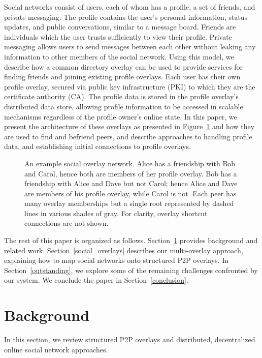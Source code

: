 \documentclass[letterpaper,twocolumn,10pt]{article}
\begin{document}
Social networks consist of users, each of whom has a profile, a set
of friends, and private messaging.  The profile contains the user's
personal information, status updates, and public conversations, similar to a
message board.  Friends are
individuals which the user trusts sufficiently to view their profile.  Private
messaging allows users to send messages between each other without leaking any
information to other members of the social network.  Using this model, we describe how a common
directory overlay can be used to provide services for finding friends and
joining existing profile overlays.  Each user has their own profile overlay,
secured via public key infrastructure (PKI) to which they are the certificate
authority (CA).  The profile data is stored in the profile overlay's distributed
data store, allowing profile information to be accessed in scalable mechanisms
regardless of the profile owner's online state.  In this paper, we present
the architecture of these overlays as presented in Figure~\ref{fig:system} and
how they are used to find and befriend peers, and describe approaches to
handling profile data, and establishing initial connections to profile overlays.

\begin{figure}[h]
\centering
{}
\caption{An example social overlay network.  Alice has a friendship with Bob and
Carol, hence both are members of her profile overlay. Bob has a
friendship with Alice and Dave but not Carol; hence Alice and Dave are members of
his profile overlay, while Carol is not.  Each peer has many overlay memberships
but a single root represented by dashed lines in various shades of gray.
For clarity, overlay shortcut connections are not shown.}
\label{fig:system}
\end{figure}

The rest of this paper is organized as follows.  Section~\ref{background}
provides background and related work.  Section~\ref{social_overlays} describes
our multi-overlay approach, explaining how to map social networks onto structured
P2P overlays.  In Section~\ref{outstanding}, we explore some of the remaining
challenges confronted by our system.  We conclude the paper in
Section~\ref{conclusion}.

\section{Background}
\label{background}
In this section, we review structured P2P overlays and distributed,
decentralized online social network approaches.
\end{document}
